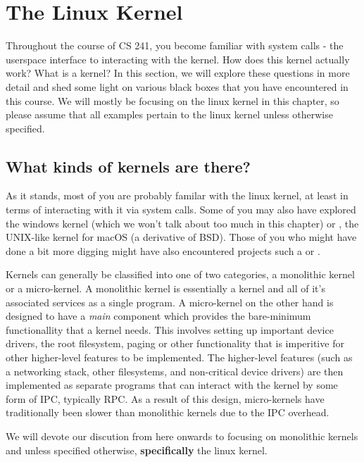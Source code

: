 \section{The Linux Kernel}

Throughout the course of CS 241, you become familiar with system calls - the userspace interface to interacting with the
kernel. How does this kernel actually work? What is a kernel? In this section, we will explore these questions in more
detail and shed some light on various black boxes that you have encountered in this course. We will mostly be focusing
on the linux kernel in this chapter, so please assume that all examples pertain to the linux kernel unless otherwise
specified.


\subsection{What kinds of kernels are there?}

As it stands, most of you are probably familar with the linux kernel, at least in terms of interacting with it via
system calls. Some of you may also have explored the windows kernel (which we won't talk about too much in this chapter)
or , the UNIX-like kernel for macOS (a derivative of BSD). Those of you who might have done a bit more
digging might have also encountered projects such a  or .

Kernels can generally be classified into one of two categories, a monolithic kernel or a micro-kernel. A monolithic
kernel is essentially a kernel and all of it's associated services as a single program. A micro-kernel on the other hand
is designed to have a \textit{main} component which provides the bare-minimum functionallity that a kernel needs. This
involves setting up important device drivers, the root filesystem, paging or other functionality that is imperitive for
other higher-level features to be implemented. The higher-level features (such as a networking stack, other filesystems,
and non-critical device drivers) are then implemented as separate programs that can interact with the kernel by some
form of IPC, typically RPC. As a result of this design, micro-kernels have traditionally been slower than monolithic
kernels due to the IPC overhead.

We will devote our discution from here onwards to focusing on monolithic kernels and unless specified otherwise,
\textbf{specifically} the linux kernel.

